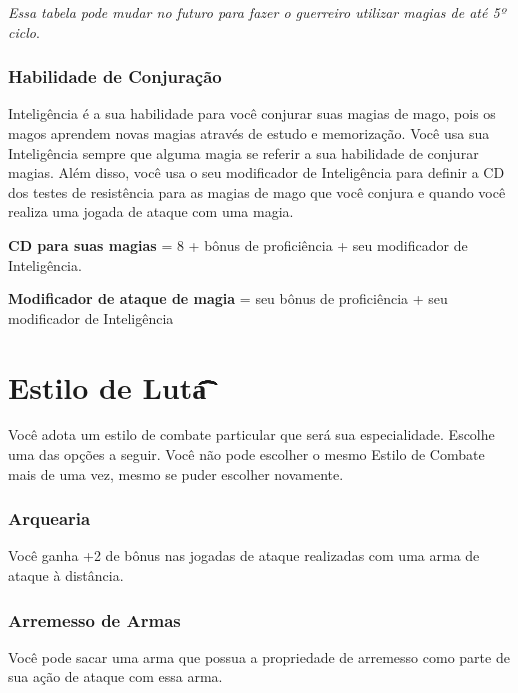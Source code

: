 \documentclass{RPG_Adventure}[2021/10/20]
\begin{document}
\begin{obs}
\textit{Essa tabela pode mudar no futuro para fazer o guerreiro utilizar magias
de até 5º ciclo}.
\end{obs}

\subsubsection*{Habilidade de Conjuração}%
\label{ssub:habilidade_de_conjuracao}

Inteligência é a sua habilidade para você conjurar suas magias de mago, pois os
magos aprendem novas magias através de estudo e memorização. Você usa sua
Inteligência sempre que alguma magia se referir a sua habilidade de conjurar
magias. Além disso, você usa o seu modificador de Inteligência para definir a CD
dos testes de resistência para as magias de mago que você conjura e quando você
realiza uma jogada de ataque com uma magia.

\begin{center}
\textbf{CD para suas magias} = 8 + bônus de proficiência + seu modificador de
Inteligência. \nl

\textbf{Modificador de ataque de magia} = seu bônus de proficiência + seu
modificador de Inteligência
\end{center}

\section*{Estilo de Luta\t\t\t\t\t\t\t\t\t}%
\label{sec:estilo_de_luta}

Você adota um estilo de combate particular que será sua especialidade. Escolhe
uma das opções a seguir. Você não pode escolher o mesmo Estilo de Combate mais
de uma vez, mesmo se puder escolher novamente.

\subsubsection{Arquearia}%
\label{ssub:arquearia}

Você ganha +2 de bônus nas jogadas de ataque realizadas com uma arma de ataque à
distância.

\subsubsection{Arremesso de Armas}%
\label{ssub:arremesso_de_armas}

Você pode sacar uma arma que possua a propriedade de arremesso como parte de sua
ação de ataque com essa arma.
\end{document}
